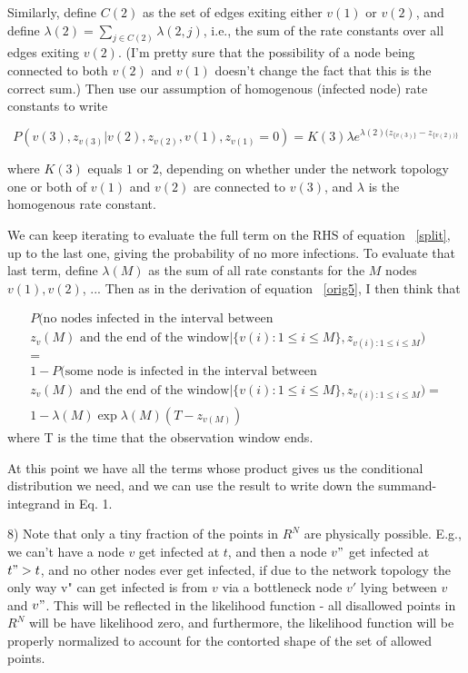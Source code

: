 \documentclass{article}
\begin{document}
	Similarly, define $C(2)$ as the set of edges exiting either $v(1)$ or
	$v(2)$, and define $\lambda(2) = \sum_{j \in C(2)} \lambda(2,j)$, i.e., the
	sum of the rate constants over all edges exiting $v(2)$. (I'm pretty
	sure that the possibility of a node being connected to both $v(2)$ and
	$v(1)$ doesn't change the fact that this is the correct sum.)  Then use
	our assumption of homogenous (infected node) rate constants to write

\begin{equation}
P(v(3), z_{v(3)} | v(2), z_{v(2)}, v(1), z_{v(1)} = 0)  =  
K(3) \lambda e^{\lambda(2) (z_{\{v(3)\}} - z_{\{v(2))\}}} 
\end{equation}

	where $K(3)$ equals $1$ or $2$, depending on whether under the network
	topology one or both of $v(1)$ and $v(2)$ are connected to $v(3)$, and
	$\lambda$ is the homogenous rate constant.

	We can keep iterating to evaluate the full term on the RHS of equation 
        ~\eqref{split}, up to the last one, giving the probability of no more 
        infections. To evaluate that last term, define $\lambda(M)$ as the sum of 
        all rate constants for the $M$ nodes $v(1), v(2)$, ... Then as in the 
        derivation of equation ~\eqref{orig5}, I then think that

\begin{align}
P(\text{no nodes infected in the interval between } \\ 
z_v(M) \text{ and the end of the window}  |   
\{v(i) : 1 \le i \le M\}, z_{v(i) : 1 \le i \le  M}) \\
=\\
1 - P(\text{some node is infected in the interval between } \\
z_v(M) \text{ and the end of the window}  |  
\{v(i) : 1 \le i \le M \}, z_{v(i) : 1 \le i \le  M}) = \\
1 - \lambda(M) \exp{\lambda(M) (T - z_{v(M)})}
\end{align}
        where T is the time that the observation window ends.

        At this point we have all the terms whose product gives us the
        conditional distribution we need, and we can use the result to write
        down the summand-integrand in Eq. 1.


	8) Note that only a tiny fraction of the points in $R^{N}$ are physically
	possible. E.g., we can't have a node $v$ get infected at $t$, and then a
	node $v"$ get infected at $t" > t$, and no other nodes ever get infected,
	if due to the network topology the only way v" can get infected is
	from $v$ via a bottleneck node $v'$ lying between $v$ and $v"$. This will be
	reflected in the likelihood function - all disallowed points in $R^{N}$
	will be have likelihood zero, and furthermore, the likelihood function
	will be properly normalized to account for the contorted shape of the
	set of allowed points.
\end{document}
